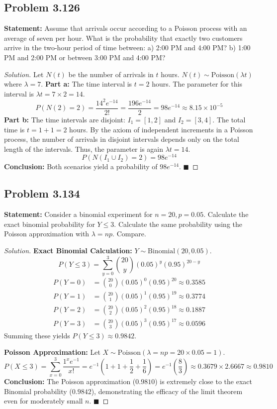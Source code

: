 \documentclass[11pt]{article}
\theoremstyle{definition}
\theoremstyle{remark}
\begin{document}
\subsection*{Problem 3.126}
\textbf{Statement:} Assume that arrivals occur according to a Poisson process with an average of seven per hour. What is the probability that exactly two customers arrive in the two-hour period of time between: a) 2:00 PM and 4:00 PM? b) 1:00 PM and 2:00 PM or between 3:00 PM and 4:00 PM?

\begin{proof}[Solution]
Let $N(t)$ be the number of arrivals in $t$ hours. $N(t) \sim \text{Poisson}(\lambda t)$ where $\lambda = 7$.
\textbf{Part a:}
The time interval is $t = 2$ hours. The parameter for this interval is $\lambda t = 7 \times 2 = 14$.
\[ P(N(2) = 2) = \frac{14^2 e^{-14}}{2!} = \frac{196 e^{-14}}{2} = 98e^{-14} \approx 8.15 \times 10^{-5} \]
\textbf{Part b:}
The time intervals are disjoint: $I_1 = [1, 2]$ and $I_2 = [3, 4]$. The total time is $t = 1 + 1 = 2$ hours. By the axiom of independent increments in a Poisson process, the number of arrivals in disjoint intervals depends only on the total length of the intervals. Thus, the parameter is again $\lambda t = 14$.
\[ P(N(I_1 \cup I_2) = 2) = 98e^{-14} \]
\textbf{Conclusion:} Both scenarios yield a probability of $98e^{-14}$. $\blacksquare$
\end{proof}

\subsection*{Problem 3.134}
\textbf{Statement:} Consider a binomial experiment for $n=20, p=0.05$. Calculate the exact binomial probability for $Y \le 3$. Calculate the same probability using the Poisson approximation with $\lambda = np$. Compare.

\begin{proof}[Solution]
\textbf{Exact Binomial Calculation:}
$Y \sim \text{Binomial}(20, 0.05)$.
\[ P(Y \le 3) = \sum_{y=0}^{3} \binom{20}{y} (0.05)^y (0.95)^{20-y} \]
\begin{align*}
P(Y=0) &= \binom{20}{0} (0.05)^0 (0.95)^{20} \approx 0.3585 \\
P(Y=1) &= \binom{20}{1} (0.05)^1 (0.95)^{19} \approx 0.3774 \\
P(Y=2) &= \binom{20}{2} (0.05)^2 (0.95)^{18} \approx 0.1887 \\
P(Y=3) &= \binom{20}{3} (0.05)^3 (0.95)^{17} \approx 0.0596
\end{align*}
Summing these yields $P(Y \le 3) \approx 0.9842$.

\textbf{Poisson Approximation:}
Let $X \sim \text{Poisson}(\lambda = np = 20 \times 0.05 = 1)$.
\[ P(X \le 3) = \sum_{x=0}^{3} \frac{1^x e^{-1}}{x!} = e^{-1} \left( 1 + 1 + \frac{1}{2} + \frac{1}{6} \right) = e^{-1} \left( \frac{8}{3} \right) \approx 0.3679 \times 2.6667 \approx 0.9810 \]
\textbf{Conclusion:} The Poisson approximation ($0.9810$) is extremely close to the exact Binomial probability ($0.9842$), demonstrating the efficacy of the limit theorem even for moderately small $n$. $\blacksquare$
\end{proof}
\end{document}
